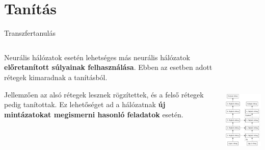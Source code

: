 \documentclass[english, aspectratio=169]{beamer}
\makeatletter
\let\origtableofcontents=\tableofcontents
\def\tableofcontents{\@ifnextchar[{\origtableofcontents}{\gobbletableofcontents}}
\def\gobbletableofcontents#1{\origtableofcontents}
\makeatother
\begin{document}
\section{Tanítás}

\begin{frame}
\tableofcontents[currentsection]
\end{frame}

\begin{frame}{Transzfertanulás}
\begin{columns}
\begin{column}{.5\textwidth}
Neurális hálózatok esetén lehetséges más neurális hálózatok \textbf{előretanított súlyainak felhasználása}. Ebben az esetben adott rétegek kimaradnak a tanításból.\par\smallskip
Jellemzően az alsó rétegek lesznek rögzítettek, és a felső rétegek pedig tanítottak. Ez lehetőséget ad a hálózatnak \textbf{új mintázatokat megismerni hasonló feladatok} esetén.
\end{column}
\begin{column}{.5\textwidth}
\begin{center}
\includegraphics[height=7cm, keepaspectratio]{graphs/dl_3.png}
\end{center}
\end{column}
\end{columns}
\end{frame}
\end{document}
